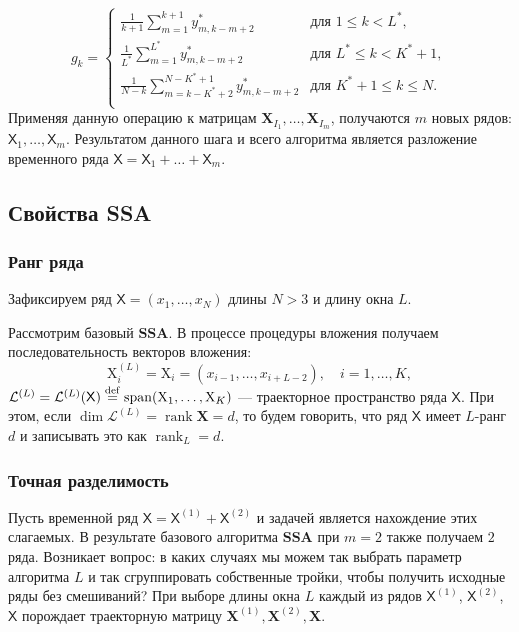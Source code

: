 \documentclass[a4paper, 11pt]{article}
\newcommand{\SSA}{\textbf{SSA}}
\newcommand{\TS}{\mathsf{X}}
\begin{document}
\begin{equation*}
	g_{k}=
	\begin{cases}
		\frac{1}{k+1} \sum\limits_{m=1}^{k+1} y_{m,k-m+2}^{*} &
		 \text{для } 1 \leq k < L^*, \\
		
		\frac{1}{L^{*}} \sum\limits_{m=1}^{L^*} y_{m,k-m+2}^{*} &
		 \text{для } L^* \leq k < K^*+1 , \\
		
		\frac{1}{N-k} \sum\limits_{m=k-K^*+2}^{N-K^*+1} y_{m,k-m+2}^{*} &
		\text{для } K^*+1 \leq k \leq N .\\
	\end{cases}
\end{equation*}
Применяя данную операцию к матрицам $\mathbf{X}_{I_1}, \dots, \mathbf{X}_{I_m}$, получаются $m$ новых рядов: $\TS_1, \dots, \TS_m$. 
Результатом данного шага и всего алгоритма является разложение временного ряда $\TS  = \TS_1 + \dots + \TS_m$.

\subsection{Свойства SSA}


\subsubsection{Ранг ряда}
\label{subsubsec: ssa_rank}
Зафиксируем ряд $\TS = (x_1, \dots, x_{N})$ длины $N > 3$ и длину окна $L$. 

Рассмотрим базовый $\SSA$. В процессе процедуры вложения получаем последовательность векторов вложения:
\begin{equation*}
	\mathrm{X}_i^{(L)} = \mathrm{X}_i = (x_{i-1}, \dots, x_{i+L-2}), \quad i = 1, \dots, K,
\end{equation*}
$\mathcal{L}^{(L)} = \mathcal{L}^{(L)}(\TS) \stackrel{{\rm def}}{{=}} \operatorname{span}(\mathrm X_{1}, \ldots, \mathrm X_{K})$ --- траекторное пространство ряда $\TS$. 
При этом, если $\dim \mathcal{L}^{(L)}= \operatorname{rank} \mathbf X = d$, то будем говорить, что ряд $\TS$ имеет $L$-ранг $d$ и записывать это как $\operatorname{rank}_L = d$.

\subsubsection{Точная разделимость}


Пусть временной ряд  $\TS = \TS^{(1)} + \TS^{(2)}$ и задачей является нахождение этих слагаемых. В результате базового алгоритма $\SSA$ при $m = 2$ также получаем $2$ ряда. Возникает вопрос: в каких случаях мы можем так выбрать параметр алгоритма $L$ и так сгруппировать собственные тройки, чтобы получить исходные ряды без смешиваний?
При выборе длины окна $L$ каждый из рядов $\TS^{(1)}$, $\TS^{(2)}$, $\TS$ порождает траекторную матрицу $\mathbf{X}^{(1)}, \mathbf{X}^{(2)}, \mathbf{X}$.
\end{document}
